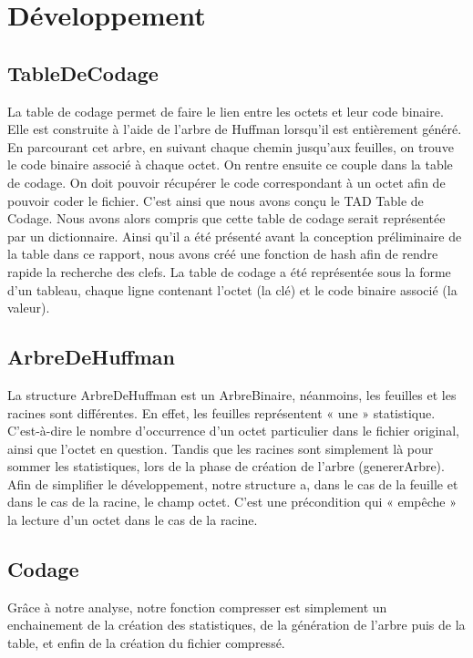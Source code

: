 \documentclass{article}
\begin{document}
\section{Développement}
    
    \subsection*{TableDeCodage}
    La table de codage permet de faire le lien entre les octets et leur code binaire. Elle est construite à l’aide de l’arbre de Huffman lorsqu’il est entièrement généré. En parcourant cet arbre, en suivant chaque chemin jusqu’aux feuilles, on trouve le code binaire associé à chaque octet. On rentre ensuite ce couple dans la table de codage. On doit pouvoir récupérer le code correspondant à un octet afin de pouvoir coder le fichier. C’est ainsi que nous avons conçu le TAD Table de Codage. 
    Nous avons alors compris que cette table de codage serait représentée par un dictionnaire. Ainsi qu’il a été présenté avant la conception préliminaire de la table dans ce rapport, nous avons créé une fonction de hash afin de rendre rapide la recherche des clefs. La table de codage a été représentée sous la forme d’un tableau, chaque ligne contenant l’octet (la clé) et le code binaire associé (la valeur).

    \subsection*{ArbreDeHuffman}
    La structure ArbreDeHuffman est un ArbreBinaire, néanmoins, les feuilles et les racines sont différentes. En effet, les feuilles représentent « une » statistique. C’est-à-dire le nombre d’occurrence d’un octet particulier dans le fichier original, ainsi que l’octet en question. Tandis que les racines sont simplement là pour sommer les statistiques, lors de la phase de création de l’arbre (genererArbre).
	Afin de simplifier le développement, notre structure a, dans le cas de la feuille et dans le cas de la racine, le champ octet. C’est une précondition qui « empêche » la lecture d’un octet dans le cas de la racine.

    \subsection*{Codage}
    Grâce à notre analyse, notre fonction compresser est simplement un enchainement de la création des statistiques, de la génération de l’arbre puis de la table, et enfin de la création du fichier compressé.
\end{document}
